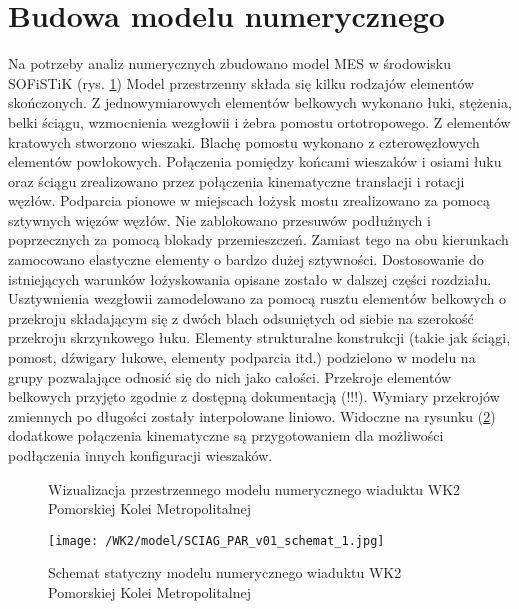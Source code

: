 \section{Budowa modelu numerycznego} \label{sect:wk2_basic_num_model}

Na potrzeby analiz numerycznych zbudowano model MES w środowisku SOFiSTiK (rys. \ref{fig: model_wk2_visualization}) Model przestrzenny składa się kilku rodzajów elementów skończonych. Z jednowymiarowych elementów belkowych wykonano łuki, stężenia, belki ściągu, wzmocnienia wezgłowii i żebra pomostu ortotropowego. Z elementów kratowych stworzono wieszaki. Blachę pomostu wykonano z czterowęzłowych elementów powłokowych. Połączenia pomiędzy końcami wieszaków i osiami łuku oraz ściągu zrealizowano przez połączenia kinematyczne translacji i rotacji węzłów. Podparcia pionowe w miejscach łożysk mostu zrealizowano za pomocą sztywnych więzów węzłów. Nie zablokowano przesuwów podłużnych i poprzecznych za pomocą blokady przemieszczeń. Zamiast tego na obu kierunkach zamocowano elastyczne elementy o bardzo dużej sztywności. Dostosowanie do istniejących warunków łożyskowania opisane zostało w dalszej części rozdziału. Usztywnienia wezgłowii zamodelowano za pomocą rusztu elementów belkowych o przekroju składającym się z dwóch blach odsuniętych od siebie na szerokość przekroju skrzynkowego łuku. Elementy strukturalne konstrukcji (takie jak ściągi, pomost, dźwigary łukowe, elementy podparcia itd.) podzielono w modelu na grupy pozwalające odnosić się do nich jako całości. Przekroje elementów belkowych przyjęto zgodnie z dostępną dokumentacją (!!!). Wymiary przekrojów zmiennych po długości zostały interpolowane liniowo. Widoczne na rysunku (\ref{fig: model_wk2_static_scheme}) dodatkowe połączenia kinematyczne są przygotowaniem dla możliwości podłączenia innych konfiguracji wieszaków.



\begin{figure}[h]
	\centering
	\captionsetup{justification=centering}
	\caption{Wizualizacja przestrzennego modelu numerycznego wiaduktu WK2 Pomorskiej Kolei Metropolitalnej}
	\label{fig: model_wk2_visualization}
	
\end{figure}
\begin{figure}[h]
	\centering
	\texttt{[image: /WK2/model/SCIAG\_PAR\_v01\_schemat\_1.jpg]}
	\captionsetup{justification=centering}
	\caption{Schemat statyczny modelu numerycznego wiaduktu WK2 Pomorskiej Kolei Metropolitalnej}
	\label{fig: model_wk2_static_scheme}
\end{figure}

